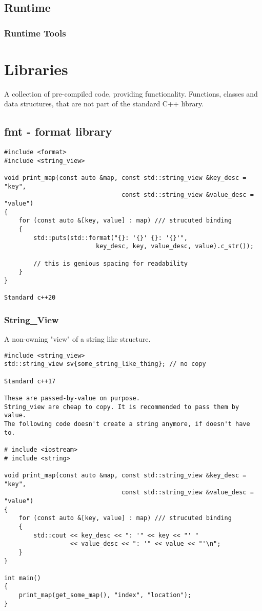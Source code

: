 \section{Runtime}

\subsection{Runtime Tools}


\chapter{Libraries}

A collection of pre-compiled code, providing functionality. Functions, classes and data structures,
that are not part of the standard C++ library.

\section{fmt - format library}

\begin{verbatim}
#include <format>
#include <string_view>

void print_map(const auto &map, const std::string_view &key_desc = "key",
                                const std::string_view &value_desc = "value")
{
    for (const auto &[key, value] : map) /// strucuted binding
    {
        std::puts(std::format("{}: '{}' {}: '{}'",
                         key_desc, key, value_desc, value).c_str());

        // this is genious spacing for readability
    }
}

Standard c++20
\end{verbatim}
\subsection{String\_View}

A non-owning "view" of a string like structure.

\begin{verbatim}
#include <string_view>
std::string_view sv{some_string_like_thing}; // no copy

Standard c++17

These are passed-by-value on purpose.
String_view are cheap to copy. It is recommended to pass them by value.
The following code doesn't create a string anymore, if doesn't have to.

# include <iostream>
# include <string>

void print_map(const auto &map, const std::string_view &key_desc = "key",
                                const std::string_view &value_desc = "value")
{
    for (const auto &[key, value] : map) /// strucuted binding
    {
        std::cout << key_desc << ": '" << key << "' "
                  << value_desc << ": '" << value << "'\n";
    }
}

int main()
{
    print_map(get_some_map(), "index", "location");
}
\end{verbatim}

